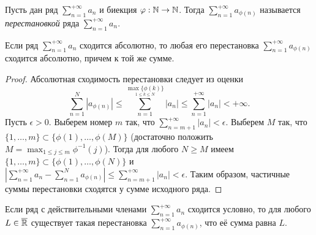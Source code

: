 \begin{definition}
    Пусть дан ряд $\sum_{n = 1}^{+\infty} a_{n}$ и биекция $\varphi: \mathbb{N} \to \mathbb{N}$. Тогда $\sum_{n = 1}^{+\infty}a_{\phi(n)}$ называется \textit{перестановкой} ряда $\sum_{n = 1}^{+\infty} a_{n}$.
\end{definition}

\begin{theorem}
    \label{convergence-9}
    Если ряд $\sum_{n = 1}^{+\infty} a_{n}$ сходится абсолютно, то любая его перестановка $\sum_{n = 1}^{+\infty} a_{\phi(n)}$ сходится абсолютно, причем к той же сумме.
\end{theorem}

\begin{proof}
    Абсолютная сходимость перестановки следует из оценки
    \[\sum_{n = 1}^{N}|a_{\phi(n)}| \leq \sum_{n = 1}^{\underset{1 \leq k \leq N}{\max\{\phi(k)\}}} |a_{n}| \leq \sum_{n = 1}^{+\infty}|a_{n}| < +\infty.\]
    Пусть $\epsilon > 0$. Выберем номер $m$ так, что $\sum_{n = m + 1}^{+\infty}|a_{n}| < \epsilon$. Выберем $M$ так, что $\{1, \ldots, m\} \subset \{\phi(1), \ldots, \phi(M)\}$ (достаточно положить $M = \max_{1 \leq j \leq m}\phi^{-1}(j)$). Тогда для любого $N \geq M$ имеем $\{1, \ldots, m\} \subset \{\phi(1), \ldots, \phi(N)\}$ и $\left|\sum_{n = 1}^{+\infty}a_{n} - \sum_{n = 1}^{N} a_{\phi(n)}\right| \leq \sum_{n = m + 1}^{+\infty}|a_{n}| < \epsilon$.
    Таким образом, частичные суммы перестановки сходятся у сумме исходного ряда.
\end{proof}

\begin{theorem}[Риман]
    Если ряд с действительными членами $\sum_{n = 1}^{+\infty} a_{n}$ сходится условно, то для любого $L \in \overline{\mathbb{R}}$ существует такая перестановка $\sum_{n = 1}^{+\infty} a_{\phi(n)}$, что её сумма равна $L$.
\end{theorem}

